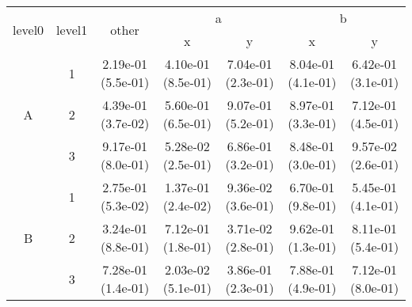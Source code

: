 \begin{tabular}{ccccccc}
\toprule
\multirow{2}{*}{level0} & \multirow{2}{*}{level1}& \multirow{2}{*}{other}&\multicolumn{2}{c}{a}&\multicolumn{2}{c}{b}\tabularnewline
\cmidrule(lr){4-5}
\cmidrule(lr){6-7}
&&&x&y&x&y\tabularnewline
\midrule
\multirow{3}{*}{A}&1& 2.19e-01 (5.5e-01)& 4.10e-01 (8.5e-01)& 7.04e-01 (2.3e-01)& 8.04e-01 (4.1e-01)& 6.42e-01 (3.1e-01)\tabularnewline
&2& 4.39e-01 (3.7e-02)& 5.60e-01 (6.5e-01)& 9.07e-01 (5.2e-01)& 8.97e-01 (3.3e-01)& 7.12e-01 (4.5e-01)\tabularnewline
&3& 9.17e-01 (8.0e-01)& 5.28e-02 (2.5e-01)& 6.86e-01 (3.2e-01)& 8.48e-01 (3.0e-01)& 9.57e-02 (2.6e-01)\tabularnewline
\midrule
\multirow{3}{*}{B}&1& 2.75e-01 (5.3e-02)& 1.37e-01 (2.4e-02)& 9.36e-02 (3.6e-01)& 6.70e-01 (9.8e-01)& 5.45e-01 (4.1e-01)\tabularnewline
&2& 3.24e-01 (8.8e-01)& 7.12e-01 (1.8e-01)& 3.71e-02 (2.8e-01)& 9.62e-01 (1.3e-01)& 8.11e-01 (5.4e-01)\tabularnewline
&3& 7.28e-01 (1.4e-01)& 2.03e-02 (5.1e-01)& 3.86e-01 (2.3e-01)& 7.88e-01 (4.9e-01)& 7.12e-01 (8.0e-01)\tabularnewline
\bottomrule
\end{tabular}
